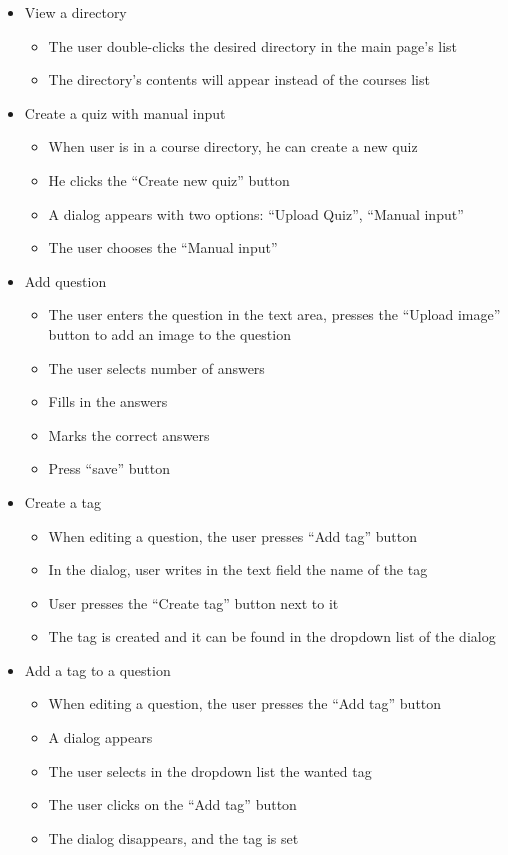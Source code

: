 \begin{itemize}
  \item View a directory
  \begin{itemize}
    \item The user double-clicks the desired directory in the main page’s list
    \item The directory’s contents will appear instead of the courses list
  \end{itemize}  

  \item Create a quiz with manual input
  \begin{itemize}
    \item When user is in a course directory, he can create a new quiz
    \item He clicks the “Create new quiz” button
    \item A dialog  appears with two options: “Upload Quiz”, “Manual input”
    \item The user chooses the “Manual input”
  \end{itemize}

  \item Add question
  \begin{itemize}
    \item The user enters the question in the text area, presses the “Upload image” button to add an image to the question
    \item The user selects number of answers
    \item Fills in the answers
    \item Marks the correct answers
    \item Press “save” button
  \end{itemize}

  \item Create a tag
  \begin{itemize}
    \item When editing a question, the user presses “Add tag” button
    \item In the dialog, user writes in the text field the name of the tag
    \item User presses the “Create tag” button next to it
    \item The tag is created and it can be found in the dropdown list of the dialog
  \end{itemize}

  \item Add a tag to a question
  \begin{itemize}
    \item When editing a question, the user presses the “Add tag” button
    \item A dialog appears
    \item The user selects in the dropdown list the wanted tag
    \item The user clicks on the “Add tag” button
    \item The dialog disappears, and the tag is set
  \end{itemize}    


\end{itemize}
